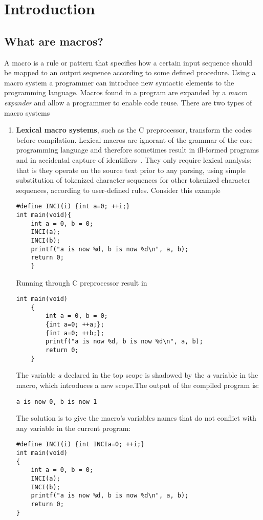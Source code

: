 \chapter{Introduction}

\section{What are macros?} 
A macro is a rule or pattern that specifies how a certain input sequence should be mapped to an output sequence according to some defined procedure. Using a macro system a programmer can introduce new syntactic elements to the programming language. Macros found in a program are expanded by a \textit{macro expander} and allow a programmer to enable code reuse.
There are two types of macro systems
\begin{enumerate}
\item {\bf Lexical macro systems}, such as the C preprocessor, transform the codes before compilation. Lexical macros are ignorant of the grammar of the core programming language and therefore sometimes result in ill-formed programs and in accidental capture of identifiers~\cite{bib3}. They only require lexical analysis; that is they operate on the source text prior to any parsing, using simple substitution of tokenized character sequences for other tokenized character sequences, according to user-defined rules.
Consider this example 
\begin{lstlisting}[frame=single]
#define INCI(i) {int a=0; ++i;}
int main(void){	
 	int a = 0, b = 0;
 	INCI(a);
  	INCI(b);
  	printf("a is now %d, b is now %d\n", a, b);
  	return 0;
	}
\end{lstlisting}

Running through C preprocessor result in
\begin{lstlisting}[frame=single]
int main(void)
	{
    	int a = 0, b = 0;
    	{int a=0; ++a;};
    	{int a=0; ++b;};
    	printf("a is now %d, b is now %d\n", a, b);
    	return 0;
	}
\end{lstlisting}

The variable {\it a} declared in the top scope is shadowed by the {\it a} variable in the macro, which introduces a new scope.The output of the compiled program is:

\begin{lstlisting}[frame=single]
a is now 0, b is now 1
\end{lstlisting}

The solution is to give the macro's variables names that do not conflict with any variable in the current program:
\begin{lstlisting}[frame=single]
#define INCI(i) {int INCIa=0; ++i;}
int main(void)
{
    int a = 0, b = 0;
    INCI(a);
    INCI(b);
    printf("a is now %d, b is now %d\n", a, b);
    return 0;
}
\end{lstlisting}


\end{enumerate}
